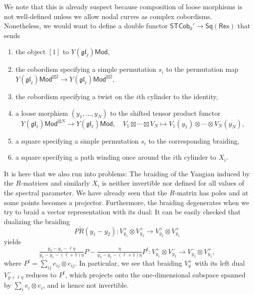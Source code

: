 \documentclass[11pt]{report}
\theoremstyle{definition}
\theoremstyle{remark}
\theoremstyle{remark}
\begin{document}
We note that this is already suspect because composition of loose morphisms is not well-defined unless we allow nodal curves as complex cobordisms. Nonetheless, we would want to define a double functor $\mathsf{STCob}_0' \to \mathsf{Sq}(\mathsf{Rex})$ that sends
\begin{enumerate}[label=(\roman*)]
\item the object $[1]$ to $Y(\mathfrak{gl}_\ell)\mathsf{Mod}$,
\item the cobordism specifying a simple permutation $s_i$ to the permutation map $Y(\mathfrak{gl}_\ell)\mathsf{Mod}^{\boxtimes 2} \to Y(\mathfrak{gl}_\ell)\mathsf{Mod}^{\boxtimes 2}$,
\item the cobordism specifying a twist on the $i$th cylinder to the identity,
\item a loose morphism $(y_1,...,y_N)$ to the shifted tensor product functor
\begin{equation*}
Y(\mathfrak{gl}_\ell)\mathsf{Mod}^{\boxtimes N} \to Y(\mathfrak{gl}_\ell)\mathsf{Mod}, \quad V_1 \boxtimes \cdots \boxtimes V_N \mapsto V_1(y_1) \otimes \cdots \otimes V_N(y_N),
\end{equation*}
\item a square specifying a simple permutation $s_i$ to the corresponding braiding,
\item a square specifying a path winding once around the $i$th cylinder to $X_i$.
\end{enumerate}
It is here that we also run into problems: The braiding of the Yangian induced by the $R$-matrices and similarly $X_i$ is neither invertible nor defined for all values of the spectral parameter. We have already seen that the $R$-matrix has poles and at some points becomes a projector. Furthermore, the braiding degenerates when we try to braid a vector representation with its dual: It can be easily checked that dualizing the braiding
\begin{equation*}
P \check R(y_1-y_2): V_{y_1}^+ \otimes V_{y_2}^+ \to V_{y_2}^+ \otimes V_{y_1}^+
\end{equation*}
yields
\begin{equation*}
\tfrac{y_2-y_1-\ell\eta}{y_2-y_1-(\ell+1)\eta} P - \tfrac{\eta}{y_2-y_1-(\ell+1)\eta} P^t: V_{y_1}^+ \otimes V_{y_2}^- \to V_{y_2}^- \otimes V_{y_1}^+,
\end{equation*}
where $P^t = \sum_{ij} e_{ij} \otimes e_{ij}$. In particular, we see that braiding $V_y^+$ with its left dual $V_{y+\ell\eta}^-$ reduces to $P^t$, which projects onto the one-dimensional subspace spanned by $\sum_i e_i \otimes e_i$, and is hence not invertible.
\end{document}
